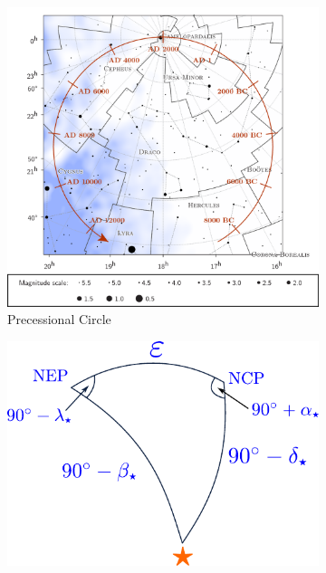 \documentclass[a4paper,12pt]{extarticle}
\begin{document}
\begin{figure}[H]
	\centering
	\begin{subfigure}{0.6\linewidth}
		\includegraphics[width=\linewidth]{presc1.png}
		\caption{Precessional Circle}
		\label{pcircle}
	\end{subfigure}
	\begin{subfigure}{0.35\linewidth}
		\includegraphics[width=\linewidth]{potd65a.pdf}
		\vspace{3cm}
	\end{subfigure}
\end{figure}
\end{document}
